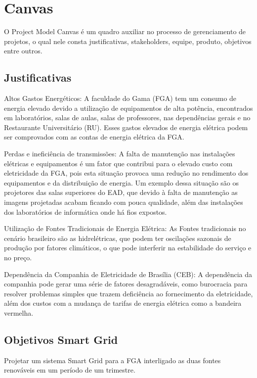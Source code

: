 \newpage

\section{Canvas}
O Project Model Canvas é um quadro auxiliar no processo de gerenciamento de projetos, o qual nele consta justificativas, stakeholders, equipe, produto, objetivos entre outros. 

\subsection{Justificativas}
\par Altos Gastos Energéticos: A faculdade do Gama (FGA) tem um consumo de energia elevado devido a utilização de equipamentos de alta potência, encontrados em laboratórios, salas de aulas, salas de professores, nas dependências gerais e no Restaurante Universitário (RU). Esses gastos elevados de energia elétrica podem ser comprovados com as contas de energia elétrica da FGA.
\par Perdas e ineficiência de transmissões: A falta de manutenção nas instalações elétricas e equipamentos é um fator que contribui para o elevado custo com eletricidade da FGA, pois esta situação provoca uma redução no rendimento dos equipamentos e da distribuição de energia. Um exemplo dessa situação são os projetores das salas superiores do EAD, que devido à falta de manutenção as imagens projetadas acabam ficando com pouca qualidade, além das instalações dos laboratórios de informática onde há fios expostos.
\par Utilização de Fontes Tradicionais de Energia Elétrica: As Fontes tradicionais no cenário brasileiro são as hidrelétricas, que podem ter oscilações sazonais de produção por fatores climáticos, o que pode interferir na estabilidade do serviço e no preço.
\par Dependência da Companhia de Eletricidade de Brasília (CEB): A dependência da companhia pode gerar uma série de fatores desagradáveis, como burocracia para resolver problemas simples que trazem deficiência ao fornecimento da eletricidade, além dos custos com a mudança de tarifas de energia elétrica como a bandeira vermelha.

\subsection{Objetivos Smart Grid}
Projetar um sistema Smart Grid para a FGA interligado as duas fontes renováveis em um período de um trimestre.

